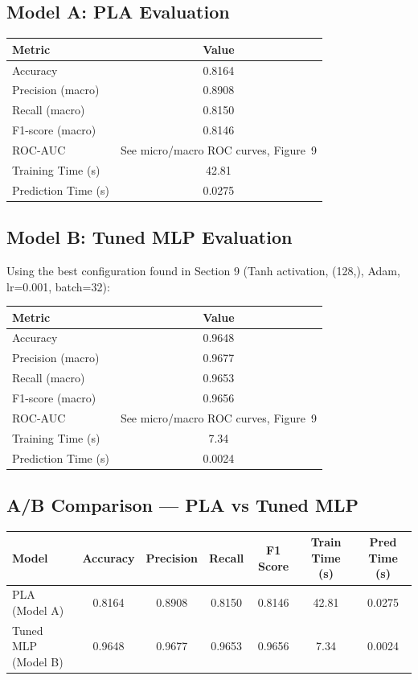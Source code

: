 \documentclass[12pt,a4paper]{article}
\begin{document}
\subsection{Model A: PLA Evaluation}
\begin{tabular}{lc}
\toprule
Metric & Value\\
\midrule
Accuracy & 0.8164 \\
Precision (macro) & 0.8908 \\
Recall (macro) & 0.8150 \\
F1-score (macro) & 0.8146 \\
ROC-AUC & See micro/macro ROC curves, Figure~9 \\
Training Time (s) & 42.81 \\
Prediction Time (s) & 0.0275 \\
\bottomrule
\end{tabular}

\subsection{Model B: Tuned MLP Evaluation}
Using the best configuration found in Section 9 (Tanh activation, (128,), Adam, lr=0.001,
batch=32):

\begin{tabular}{lc}
\toprule
Metric & Value\\
\midrule
Accuracy & 0.9648 \\
Precision (macro) & 0.9677 \\
Recall (macro) & 0.9653 \\
F1-score (macro) & 0.9656 \\
ROC-AUC & See micro/macro ROC curves, Figure~9 \\
Training Time (s) & 7.34 \\
Prediction Time (s) & 0.0024 \\
\bottomrule
\end{tabular}

\subsection{A/B Comparison — PLA vs Tuned MLP}
\begin{tabular}{lcccccc}
\toprule
Model & Accuracy & Precision & Recall & F1 Score & Train Time (s) & Pred Time (s)\\
\midrule
PLA (Model A) & 0.8164 & 0.8908 & 0.8150 & 0.8146 & 42.81 & 0.0275 \\
Tuned MLP (Model B) & 0.9648 & 0.9677 & 0.9653 & 0.9656 & 7.34 & 0.0024 \\
\bottomrule
\end{tabular}
\end{document}
